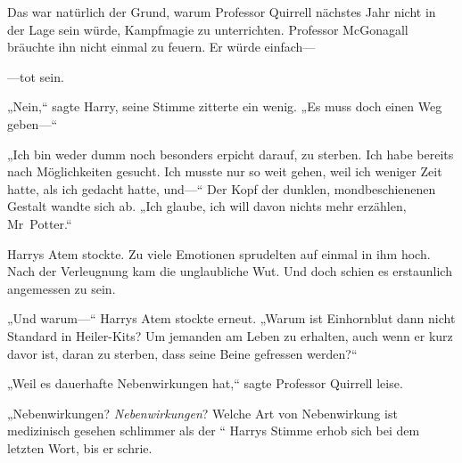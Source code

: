 Das war natürlich der Grund, warum Professor Quirrell nächstes Jahr nicht in der Lage sein würde, Kampfmagie zu unterrichten. Professor McGonagall bräuchte ihn nicht einmal zu feuern. Er würde einfach—

—tot sein.

„Nein,“ sagte Harry, seine Stimme zitterte ein wenig. „Es muss doch einen Weg geben—“

„Ich bin weder dumm noch besonders erpicht darauf, zu sterben. Ich habe bereits nach Möglichkeiten gesucht. Ich musste nur so weit gehen, weil ich weniger Zeit hatte, als ich gedacht hatte, und—“ Der Kopf der dunklen, mondbeschienenen Gestalt wandte sich ab. „Ich glaube, ich will davon nichts mehr erzählen, Mr~Potter.“

Harrys Atem stockte. Zu viele Emotionen sprudelten auf einmal in ihm hoch. Nach der Verleugnung kam die unglaubliche Wut. Und doch schien es erstaunlich angemessen zu sein.

„Und warum—“ Harrys Atem stockte erneut. „Warum ist Einhornblut dann nicht Standard in Heiler-Kits? Um jemanden am Leben zu erhalten, auch wenn er kurz davor ist, daran zu sterben, dass seine Beine gefressen werden?“

„Weil es dauerhafte Nebenwirkungen hat,“ sagte Professor Quirrell leise.

„Nebenwirkungen? \emph{Nebenwirkungen}? Welche Art von Nebenwirkung ist medizinisch gesehen schlimmer als der “ Harrys Stimme erhob sich bei dem letzten Wort, bis er schrie.

